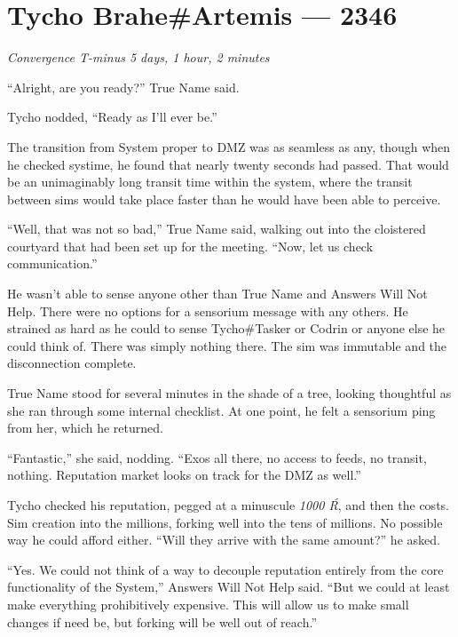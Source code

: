 \hypertarget{tycho-braheartemis-2346}{%
\chapter{Tycho Brahe\#Artemis — 2346}\label{tycho-braheartemis-2346}}

\begin{center}
\emph{Convergence T-minus 5 days, 1 hour, 2 minutes}
\end{center}

\noindent ``Alright, are you ready?'' True Name said.

Tycho nodded, ``Ready as I'll ever be.''

The transition from System proper to DMZ was as seamless as any, though when he checked systime, he found that nearly twenty seconds had passed. That would be an unimaginably long transit time within the system, where the transit between sims would take place faster than he would have been able to perceive.

``Well, that was not so bad,'' True Name said, walking out into the cloistered courtyard that had been set up for the meeting. ``Now, let us check communication.''

He wasn't able to sense anyone other than True Name and Answers Will Not Help. There were no options for a sensorium message with any others. He strained as hard as he could to sense Tycho\#Tasker or Codrin or anyone else he could think of. There was simply nothing there. The sim was immutable and the disconnection complete.

True Name stood for several minutes in the shade of a tree, looking thoughtful as she ran through some internal checklist. At one point, he felt a sensorium ping from her, which he returned.

``Fantastic,'' she said, nodding. ``Exos all there, no access to feeds, no transit, nothing. Reputation market looks on track for the DMZ as well.''

Tycho checked his reputation, pegged at a minuscule \emph{1000 Ŕ}, and then the costs. Sim creation into the millions, forking well into the tens of millions. No possible way he could afford either. ``Will they arrive with the same amount?'' he asked.

``Yes. We could not think of a way to decouple reputation entirely from the core functionality of the System,'' Answers Will Not Help said. ``But we could at least make everything prohibitively expensive. This will allow us to make small changes if need be, but forking will be well out of reach.''

